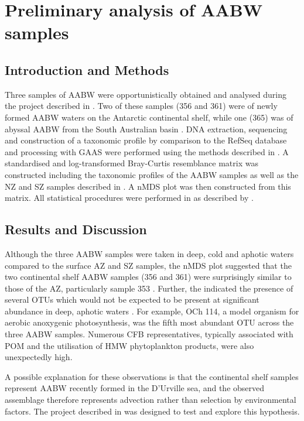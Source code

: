 \chapter{Preliminary analysis of \ac{AABW} samples}
\label{ch:deepappendix}

\section{Introduction and Methods}

Three samples of \ac{AABW} were opportunistically obtained and analysed during the project described in .
Two of these samples (356 and 361) were of newly formed \ac{AABW} waters on the Antarctic continental shelf, while one (365) was of abyssal \ac{AABW} from the South Australian basin .
DNA extraction, sequencing and construction of a taxonomic profile by  comparison to the RefSeq database and processing with \ac{GAAS} were performed using the methods described in .
A standardised and log-transformed Bray-Curtis resemblance matrix was constructed including the taxonomic profiles of the \ac{AABW} samples as well as the \ac{NZ} and \ac{SZ} samples described in .
A \ac{nMDS} plot was then constructed from this matrix.
All statistical procedures were performed in  as described by \citet{Clarke:2001ut}.

\section{Results and Discussion}

Although the three \ac{AABW} samples were taken in deep, cold and aphotic waters  compared to the surface \ac{AZ} and \ac{SZ} samples, the \ac{nMDS} plot suggested that the two continental shelf \ac{AABW} samples (356 and 361) were surprisingly similar to those of the \ac{AZ}, particularly sample 353 .
Further, the indicated the presence of several \acp{OTU} which would not be expected to be present at significant abundance in deep, aphotic waters .
For example,  OCh 114, a model organism for aerobic anoxygenic photosynthesis, was the fifth most abundant \ac{OTU} across the three \ac{AABW} samples.
Numerous \ac{CFB} representatives, typically associated with \ac{POM} and the utilisation of \ac{HMW} phytoplankton products, were also unexpectedly high.



A possible explanation for these observations is that the continental shelf samples represent \ac{AABW} recently formed in the D'Urville sea, and the observed assemblage therefore represents advection rather than selection by environmental factors.
The project described in  was designed to test and explore this hypothesis.


